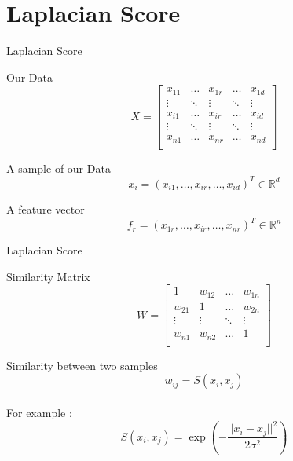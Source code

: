 \documentclass{beamer}
\begin{document}
\section{Laplacian Score}
\begin{frame}{Laplacian Score}
    \begin{block}{Our Data}
     \[ X =
        \begin{bmatrix}
        x_{11} & \dots & x_{1r} & \dots & x_{1d} \\
        \vdots & \ddots & \vdots & \ddots & \vdots \\
        x_{i1} & \dots & x_{ir} & \dots & x_{id} \\
        \vdots & \ddots & \vdots & \ddots & \vdots \\
        x_{n1} & \dots & x_{nr} & \dots & x_{nd} \\
        \end{bmatrix}
        \]
    \end{block}

    \begin{block}{A sample of our Data}
        \[ x_i = (x_{i1}, \dots, x_{ir}, \dots, x_{id})^T \in \mathbb{R}^d \]
    \end{block}

    \begin{block}{A feature vector}
        \[ f_{r} = (x_{1r}, \dots, x_{ir}, \dots, x_{nr})^T \in \mathbb{R}^n \]
    \end{block}
\end{frame}

\begin{frame}{Laplacian Score}

    \begin{block}{Similarity Matrix}
        \[ W = \begin{bmatrix}
            1 & w_{12} & \dots & w_{1n} \\
            w_{21} & 1 & \dots & w_{2n} \\
            \vdots & \vdots & \ddots & \vdots \\
            w_{n1} & w_{n2} & \dots & 1 \\
        \end{bmatrix} \]
    \end{block}

    \begin{block}{Similarity between two samples}
        \[ w_{ij} = S(x_i,x_j) \]
        \\
       For example :  \[ S(x_i,x_j) = \exp(-\frac{||x_i - x_j||^2}{2\sigma^2}) \]
    \end{block}
\end{frame}
\end{document}
